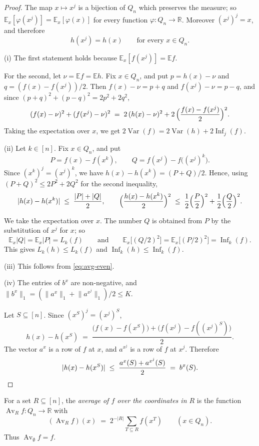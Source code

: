 \documentclass[11pt,reqno]{amsart}
\theoremstyle{definition}
\theoremstyle{remark}
\numberwithin{equation}{section}
\theoremstyle{named}
\theoremstyle{plain}
\newcommand{\R}{\mathbb{R}}
\newcommand{\E}{\mathbb{E}}
\newcommand{\Var}{\operatorname{Var}}
\newcommand{\Inf}{\operatorname{Inf}}
\newcommand{\Av}{\operatorname{Av}}
\newcommand{\norm}[1]{\lVert #1\rVert_1}
\newcommand{\abs}[1]{\lvert #1\rvert}
\begin{document}
\begin{proof}
The map $x\mapsto x^{j}$ is a bijection of $Q_n$ which preserves the measure; so
$\E_x[\varphi(x^{j})]=\E_x[\varphi(x)]$ for every function $\varphi\colon Q_n\to\R$. Moreover
$(x^{j})^{j}=x$, and therefore
\begin{equation}\label{eq:avg-even}
   h(x^{j})=h(x)\qquad\text{for every }x\in Q_n .
\end{equation}

(i) The first statement holds because $\E_x[f(x^{j})]=\E f$.

For the second, let
$\nu=\E f=\E h$. Fix $x\in Q_n$, and put $p=h(x)-\nu$ and $q=(f(x)-f(x^{j}))/2$. Then
$f(x)-\nu=p+q$ and $f(x^{j})-\nu=p-q$, and since $(p+q)^{2}+(p-q)^{2}=2p^{2}+2q^{2}$,
\[
   (f(x)-\nu)^{2}+(f(x^{j})-\nu)^{2}
   \;=\;2\,(h(x)-\nu)^{2}+2\,\Bigl(\frac{f(x)-f(x^{j})}{2}\Bigr)^{2}.
\]
Taking the expectation over $x$, we get $2\Var(f)=2\Var(h)+2\Inf_j(f)$.

(ii) Let $k\in[n]$. Fix $x\in Q_n$, and put
\[
   P=f(x)-f(x^{k}),\qquad Q=f(x^{j})-f\bigl((x^{j})^{k}\bigr).
\]
Since $(x^{k})^{j}=(x^{j})^{k}$, we have $h(x)-h(x^{k})=(P+Q)/2$. Hence, using
$(P+Q)^{2}\le2P^{2}+2Q^{2}$ for the second inequality,
\[
   \abs{h(x)-h(x^{k})}\;\le\;\frac{\abs{P}+\abs{Q}}{2},\qquad
   \Bigl(\frac{h(x)-h(x^{k})}{2}\Bigr)^{2}\;\le\;
   \frac12\Bigl(\frac{P}{2}\Bigr)^{2}+\frac12\Bigl(\frac{Q}{2}\Bigr)^{2}.
\]

We take the expectation over $x$. The number $Q$ is obtained from $P$ by the substitution of
$x^{j}$ for $x$; so
\[
   \E_x\abs{Q}=\E_x\abs{P}=L_k(f)\qquad\text{and}\qquad
   \E_x\bigl[(Q/2)^{2}\bigr]=\E_x\bigl[(P/2)^{2}\bigr]=\Inf_k(f).
\]
This gives $L_k(h)\le L_k(f)$ and
$\Inf_k(h)\le\Inf_k(f)$.

(iii) This follows from \eqref{eq:avg-even}.

(iv) The entries of $b^{x}$ are non-negative, and
$\norm{b^{x}}=(\norm{a^{x}}+\norm{a^{x^{j}}})/2\le K$.

Let $S\subseteq[n]$. Since
$(x^{S})^{j}=(x^{j})^{S}$,
\[
   h(x)-h(x^{S})\;=\;\frac{\bigl(f(x)-f(x^{S})\bigr)+\bigl(f(x^{j})-f((x^{j})^{S})\bigr)}{2}.
\]
The vector $a^{x}$ is a row of $f$ at $x$, and $a^{x^{j}}$ is a row of $f$ at $x^{j}$. Therefore
\[
   \abs{h(x)-h(x^{S})}\;\le\;\frac{a^{x}(S)+a^{x^{j}}(S)}{2}\;=\;b^{x}(S). \qedhere
\]
\end{proof}

For a set $R\subseteq[n]$, the \emph{average of $f$ over the coordinates in $R$} is the function
$\Av_Rf\colon Q_n\to\R$ with
\[
   (\Av_Rf)(x)\;=\;2^{-\abs{R}}\sum_{T\subseteq R}f(x^{T})\qquad(x\in Q_n).
\]
Thus $\Av_{\emptyset}f=f$.
\end{document}
